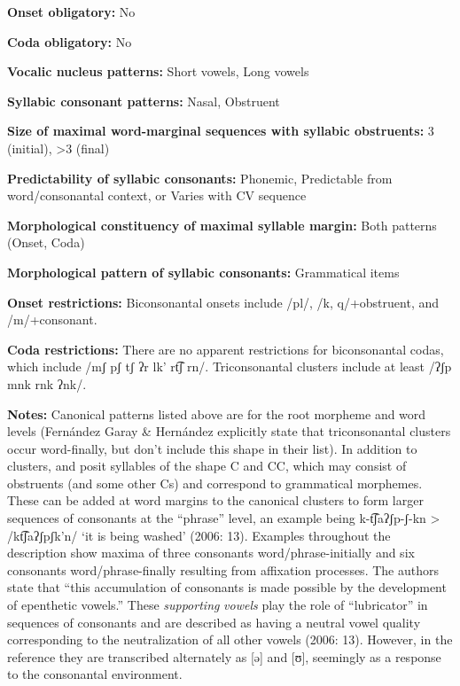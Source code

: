 \textbf{Onset obligatory:} No



\textbf{Coda obligatory:} No



\textbf{Vocalic nucleus patterns:} Short vowels, Long vowels



\textbf{Syllabic consonant patterns:} Nasal, Obstruent



\textbf{Size of maximal word{}-marginal sequences with syllabic obstruents:} 3 (initial), >3 (final)



\textbf{Predictability of syllabic consonants:} Phonemic, Predictable from word/consonantal context, or Varies with CV sequence



\textbf{Morphological constituency of maximal syllable margin:} Both patterns (Onset, Coda)



\textbf{Morphological pattern of syllabic consonants:} Grammatical items



\textbf{Onset restrictions:} Biconsonantal onsets include /pl/, /k, q/+obstruent, and /m/+consonant.



\textbf{Coda restrictions:} There are no apparent restrictions for biconsonantal codas, which include /mʃ pʃ tʃ ʔr lk' rt͡ʃ rn/. Triconsonantal clusters include at least /ʔʃp mnk rnk ʔnk/.



\textbf{Notes:} Canonical patterns listed above are for the root morpheme and word levels (Fernández Garay \& Hernández explicitly state that triconsonantal clusters occur word-finally, but don’t include this shape in their list). In addition to clusters,  \citet{FernándezGaray1998} and  \citet{FernándezGarayHernández2006} posit syllables of the shape C and CC, which may consist of obstruents (and some other Cs) and correspond to grammatical morphemes. These can be added at word margins to the canonical clusters to form larger sequences of consonants at the “phrase” level, an example being k{}-t͡ʃaʔʃp{}-ʃ{}-kn > /kt͡ʃaʔʃpʃk’n/ ‘it is being washed’ (2006: 13). Examples throughout the description show maxima of three consonants word/phrase-initially and six consonants word/phrase-finally resulting from affixation processes. The authors state that “this accumulation of consonants is made possible by the development of epenthetic vowels.” These \textit{supporting} \textit{vowels} play the role of “lubricator” in sequences of consonants and are described as having a neutral vowel quality corresponding to the neutralization of all other vowels (2006: 13). However, in the  reference they are transcribed alternately as [ə] and [ʊ], seemingly as a response to the consonantal environment.



